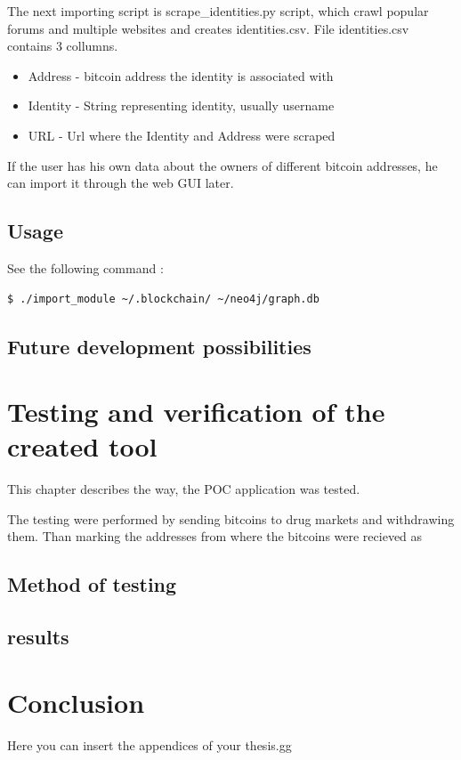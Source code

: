 \documentclass[
  digital, %
  table,   %
  lof,     %
  lot,     %
  oneside
]{fithesis3}
\begin{document}
The next importing script is scrape\_identities.py script, which crawl popular forums and multiple websites and creates identities.csv.
File identities.csv contains 3 collumns.
\begin{itemize}
  \item Address - bitcoin address the identity is associated with
  \item Identity - String representing identity, usually username
  \item URL - Url where the Identity and Address were scraped
\end{itemize}

If the user has his own data about the owners of different bitcoin addresses, he can import it through the web GUI later.


\section{Usage}

\noindent See the following command :
\begin{lstlisting}[language=bash]
  $ ./import_module ~/.blockchain/ ~/neo4j/graph.db
\end{lstlisting}

\section{Future development possibilities}


\chapter{Testing and verification of the created tool}
This chapter describes the way, the POC application was tested.

The testing were performed by sending bitcoins to drug markets and withdrawing them.
Than marking the addresses from where the bitcoins were recieved as 

\section{Method of testing}
\section{results}



\chapter{Conclusion}

Here you can insert the appendices of your thesis.gg
\end{document}
